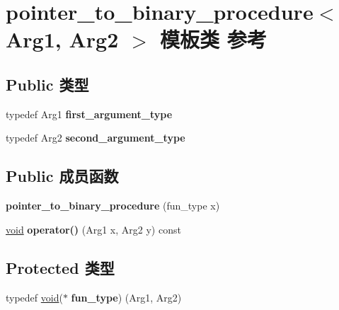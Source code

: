 \hypertarget{classpointer__to__binary__procedure}{}\section{pointer\+\_\+to\+\_\+binary\+\_\+procedure$<$ Arg1, Arg2 $>$ 模板类 参考}
\label{classpointer__to__binary__procedure}
\subsection*{Public 类型}
\begin{DoxyCompactItemize}
\item 
\mbox{\label{classpointer__to__binary__procedure_ab3c41e2d1c3abe3cf6594daedc1695f2}} 
typedef Arg1 {\bfseries first\+\_\+argument\+\_\+type}
\item 
\mbox{\label{classpointer__to__binary__procedure_ac1a9e894fcd7faf1c795db3221c4bc1b}} 
typedef Arg2 {\bfseries second\+\_\+argument\+\_\+type}
\end{DoxyCompactItemize}
\subsection*{Public 成员函数}
\begin{DoxyCompactItemize}
\item 
\mbox{\label{classpointer__to__binary__procedure_ac957a8328376fc345fce03dc4da0f88f}} 
{\bfseries pointer\+\_\+to\+\_\+binary\+\_\+procedure} (fun\+\_\+type x)
\item 
\mbox{\label{classpointer__to__binary__procedure_a2ff3d5062df4e85ca5450a17b9b7a32e}} 
\hyperlink{interfacevoid}{void} {\bfseries operator()} (Arg1 x, Arg2 y) const
\end{DoxyCompactItemize}
\subsection*{Protected 类型}
\begin{DoxyCompactItemize}
\item 
\mbox{\label{classpointer__to__binary__procedure_a64ab50ab4bc35e46f4b1d427e09b241e}} 
typedef \hyperlink{interfacevoid}{void}($\ast$ {\bfseries fun\+\_\+type}) (Arg1, Arg2)
\end{DoxyCompactItemize}
